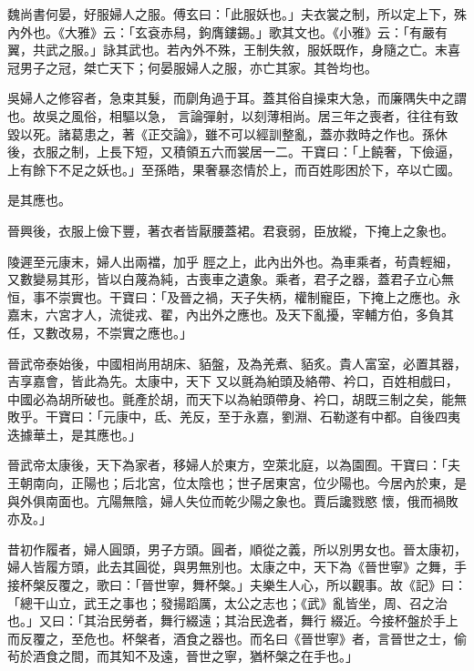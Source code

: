 \begin{pinyinscope}
 魏尚書何晏，好服婦人之服。傅玄曰：「此服妖也。」夫衣裳之制，所以定上下，殊內外也。《大雅》云：「玄袞赤舄，鉤膺鏤錫。」歌其文也。《小雅》云：「有嚴有翼，共武之服。」詠其武也。若內外不殊，王制失敘，服妖既作，身隨之亡。末喜冠男子之冠，桀亡天下；何晏服婦人之服，亦亡其家。其咎均也。



 吳婦人之修容者，急束其髮，而劘角過于耳。蓋其俗自操束大急，而廉隅失中之謂也。故吳之風俗，相驅以急，
 言論彈射，以刻薄相尚。居三年之喪者，往往有致毀以死。諸葛患之，著《正交論》，雖不可以經訓整亂，蓋亦救時之作也。孫休後，衣服之制，上長下短，又積領五六而裳居一二。干寶曰：「上饒奢，下儉逼，上有餘下不足之妖也。」至孫皓，果奢暴恣情於上，而百姓彫困於下，卒以亡國。



 是其應也。



 晉興後，衣服上儉下豐，著衣者皆厭腰蓋裙。君衰弱，臣放縱，下掩上之象也。



 陵遲至元康末，婦人出兩襠，加乎
 脛之上，此內出外也。為車乘者，茍貴輕細，又數變易其形，皆以白蔑為純，古喪車之遺象。乘者，君子之器，蓋君子立心無恒，事不崇實也。干寶曰：「及晉之禍，天子失柄，權制寵臣，下掩上之應也。永嘉末，六宮才人，流徙戎、翟，內出外之應也。及天下亂擾，宰輔方伯，多負其任，又數改易，不崇實之應也。」



 晉武帝泰始後，中國相尚用胡床、貊盤，及為羌煮、貊炙。貴人富室，必置其器，吉享嘉會，皆此為先。太康中，天下
 又以氈為絈頭及絡帶、衿口，百姓相戲曰，中國必為胡所破也。氈產於胡，而天下以為絈頭帶身、衿口，胡既三制之矣，能無敗乎。干寶曰：「元康中，氐、羌反，至于永嘉，劉淵、石勒遂有中都。自後四夷迭據華土，是其應也。」



 晉武帝太康後，天下為家者，移婦人於東方，空萊北庭，以為園囿。干寶曰：「夫王朝南向，正陽也；后北宮，位太陰也；世子居東宮，位少陽也。今居內於東，是與外俱南面也。亢陽無陰，婦人失位而乾少陽之象也。賈后讒戮愍
 懷，俄而禍敗亦及。」



 昔初作履者，婦人圓頭，男子方頭。圓者，順從之義，所以別男女也。晉太康初，婦人皆履方頭，此去其圓從，與男無別也。太康之中，天下為《晉世寧》之舞，手接杯槃反覆之，歌曰：「晉世寧，舞杯槃。」夫樂生人心，所以觀事。故《記》曰：「總干山立，武王之事也；發揚蹈厲，太公之志也；《武》亂皆坐，周、召之治也。」又曰：「其治民勞者，舞行綴遠；其治民逸者，舞行
 綴近。今接杯盤於手上而反覆之，至危也。杯槃者，酒食之器也。而名曰《晉世寧》者，言晉世之士，偷茍於酒食之間，而其知不及遠，晉世之寧，猶杯槃之在手也。」




\end{pinyinscope}
